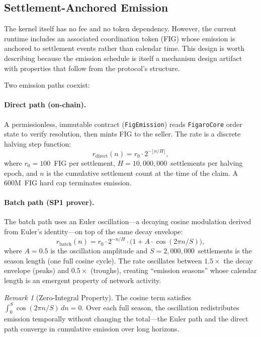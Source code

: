 \documentclass[11pt,a4paper]{article}
\theoremstyle{definition}
\theoremstyle{remark}
\newtheorem{remark}[theorem]{Remark}
\begin{document}
\subsection{Settlement-Anchored Emission}

The kernel itself has no fee and no token dependency. However, the
current runtime includes an associated coordination token (FIG) whose
emission is anchored to settlement events rather than calendar time.
This design is worth describing because the emission schedule is itself
a mechanism design artifact with properties that follow from the
protocol's structure.

Two emission paths coexist:

\paragraph{Direct path (on-chain).}
A permissionless, immutable contract (\texttt{FigEmission}) reads
\texttt{FigaroCore} order state to verify resolution, then mints FIG
to the seller. The rate is a discrete halving step function:
\begin{equation}
  r_{\text{direct}}(n) = r_0 \cdot 2^{-\lfloor n/H \rfloor},
  \label{eq:direct-emission}
\end{equation}
where $r_0 = 100$~FIG per settlement, $H = 10{,}000{,}000$~settlements
per halving epoch, and $n$ is the cumulative settlement count at the
time of the claim. A 600M~FIG hard cap terminates emission.

\paragraph{Batch path (SP1 prover).}
The batch path uses an Euler oscillation---a decaying cosine modulation
derived from Euler's identity---on top of the same decay envelope:
\begin{equation}
  r_{\text{batch}}(n) = r_0 \cdot 2^{-n/H} \cdot
    \bigl(1 + A \cdot \cos(2\pi n / S)\bigr),
  \label{eq:euler-emission}
\end{equation}
where $A = 0.5$ is the oscillation amplitude and
$S = 2{,}000{,}000$~settlements is the season length (one full
cosine cycle). The rate oscillates between $1.5 \times$ the decay
envelope (peaks) and $0.5 \times$ (troughs), creating ``emission
seasons'' whose calendar length is an emergent property of network
activity.

\begin{remark}[Zero-Integral Property]
The cosine term satisfies $\int_0^S \cos(2\pi n/S)\,dn = 0$. Over
each full season, the oscillation redistributes emission temporally
without changing the total---the Euler path and the direct path
converge in cumulative emission over long horizons.
\end{remark}
\end{document}
